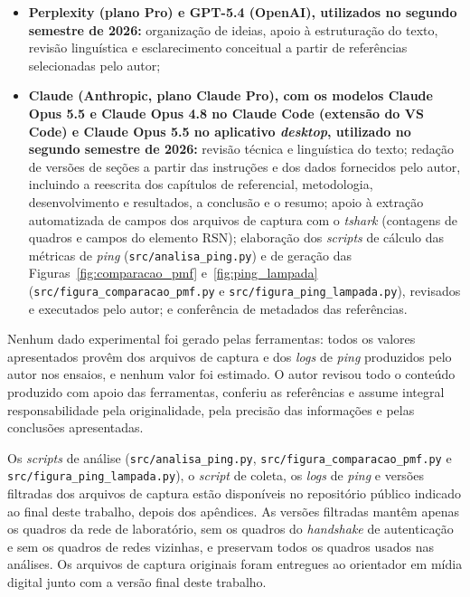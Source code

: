 \begin{itemize}
    \item \textbf{Perplexity (plano Pro) e GPT-5.4 (OpenAI), utilizados no segundo semestre de 2026:} organização de ideias, apoio à estruturação do texto, revisão linguística e esclarecimento conceitual a partir de referências selecionadas pelo autor;
    \item \textbf{Claude (Anthropic, plano Claude Pro), com os modelos Claude Opus 5.5 e Claude Opus 4.8 no Claude Code (extensão do VS Code) e Claude Opus 5.5 no aplicativo \textit{desktop}, utilizado no segundo semestre de 2026:} revisão técnica e linguística do texto; redação de versões de seções a partir das instruções e dos dados fornecidos pelo autor, incluindo a reescrita dos capítulos de referencial, metodologia, desenvolvimento e resultados, a conclusão e o resumo; apoio à extração automatizada de campos dos arquivos de captura com o \textit{tshark} (contagens de quadros e campos do elemento RSN); elaboração dos \textit{scripts} de cálculo das métricas de \textit{ping} (\texttt{src/analisa\_ping.py}) e de geração das Figuras~\ref{fig:comparacao_pmf} e~\ref{fig:ping_lampada} (\texttt{src/figura\_comparacao\_pmf.py} e \texttt{src/figura\_ping\_lampada.py}), revisados e executados pelo autor; e conferência de metadados das referências.
\end{itemize}

Nenhum dado experimental foi gerado pelas ferramentas: todos os valores apresentados provêm dos arquivos de captura e dos \textit{logs} de \textit{ping} produzidos pelo autor nos ensaios, e nenhum valor foi estimado. O autor revisou todo o conteúdo produzido com apoio das ferramentas, conferiu as referências e assume integral responsabilidade pela originalidade, pela precisão das informações e pelas conclusões apresentadas.

Os \textit{scripts} de análise (\texttt{src/analisa\_ping.py}, \texttt{src/figura\_comparacao\_pmf.py} e \texttt{src/figura\_ping\_lampada.py}), o \textit{script} de coleta, os \textit{logs} de \textit{ping} e versões filtradas dos arquivos de captura estão disponíveis no repositório público indicado ao final deste trabalho, depois dos apêndices. As versões filtradas mantêm apenas os quadros da rede de laboratório, sem os quadros do \textit{handshake} de autenticação e sem os quadros de redes vizinhas, e preservam todos os quadros usados nas análises. Os arquivos de captura originais foram entregues ao orientador em mídia digital junto com a versão final deste trabalho.

